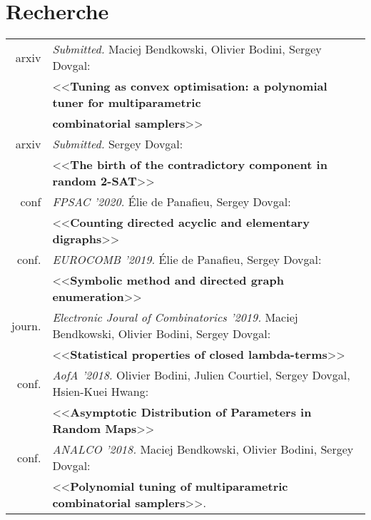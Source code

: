 \documentclass[a4paper,10pt]{article} %
\begin{document}
\vfill


\section{Recherche}
\begin{tabular}{rl}
arxiv & \textit{Submitted.} Maciej Bendkowski, Olivier Bodini, Sergey Dovgal:
    \\&
    <<\textbf{Tuning as convex optimisation: a polynomial tuner for
    multiparametric}\\
    &\textbf{combinatorial samplers}>>
\\
arxiv & \textit{Submitted.} Sergey Dovgal:
    \\&
<<\textbf{The birth of the contradictory component in random 2-SAT}>>
\\
conf & \textit{FPSAC '2020.} Élie de Panafieu, Sergey Dovgal:
    \\&
<<\textbf{Counting directed acyclic and elementary digraphs}>>
\\
conf. & \textit{EUROCOMB '2019.} Élie de Panafieu, Sergey Dovgal:
    \\&
<<\textbf{Symbolic method and directed graph enumeration}>>
\\
journ. & \textit{Electronic Joural of Combinatorics '2019.}
Maciej Bendkowski, Olivier Bodini, Sergey
     Dovgal:\\&
<<\textbf{Statistical properties of closed lambda-terms}>>
\\
conf. & \textit{AofA '2018.} Olivier Bodini, Julien Courtiel, Sergey Dovgal, Hsien-Kuei Hwang:\\&
<<\textbf{Asymptotic Distribution of Parameters in Random Maps}>>
\\
conf. & \textit{ANALCO '2018.} Maciej Bendkowski, Olivier Bodini, Sergey
    Dovgal:
\\
& <<\textbf{Polynomial tuning 
of multiparametric combinatorial samplers}>>.

\end{tabular}
\end{document}
